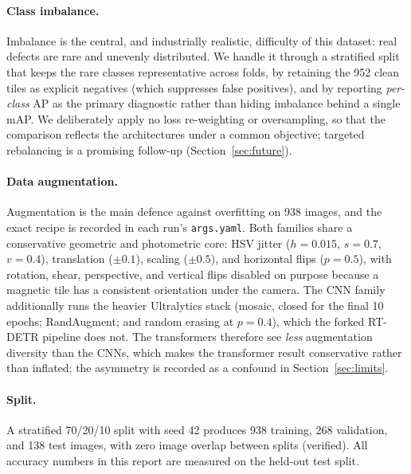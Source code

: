 \documentclass[11pt,a4paper]{article}
\begin{document}
\paragraph{Class imbalance.}
Imbalance is the central, and industrially realistic, difficulty of this dataset: real defects are
rare and unevenly distributed. We handle it through a stratified split that keeps the rare classes
representative across folds, by retaining the 952 clean tiles as explicit negatives (which
suppresses false positives), and by reporting \emph{per-class} AP as the primary diagnostic rather
than hiding imbalance behind a single mAP. We deliberately apply no loss re-weighting or
oversampling, so that the comparison reflects the architectures under a common objective; targeted
rebalancing is a promising follow-up (Section~\ref{sec:future}).

\paragraph{Data augmentation.}
Augmentation is the main defence against overfitting on 938 images, and the exact recipe is recorded
in each run's \texttt{args.yaml}. Both families share a conservative geometric and photometric core:
HSV jitter ($h{=}0.015$, $s{=}0.7$, $v{=}0.4$), translation ($\pm 0.1$), scaling ($\pm 0.5$), and
horizontal flips ($p{=}0.5$), with rotation, shear, perspective, and vertical flips disabled on
purpose because a magnetic tile has a consistent orientation under the camera. The CNN family
additionally runs the heavier Ultralytics stack (mosaic, closed for the final 10 epochs;
RandAugment; and random erasing at $p{=}0.4$), which the forked RT-DETR pipeline does not. The
transformers therefore see \emph{less} augmentation diversity than the CNNs, which makes the
transformer result conservative rather than inflated; the asymmetry is recorded as a confound in
Section~\ref{sec:limits}.

\paragraph{Split.}
A stratified 70/20/10 split with seed 42 produces 938 training, 268 validation, and 138 test
images, with zero image overlap between splits (verified). All accuracy numbers in this report are
measured on the held-out test split.

\end{document}
